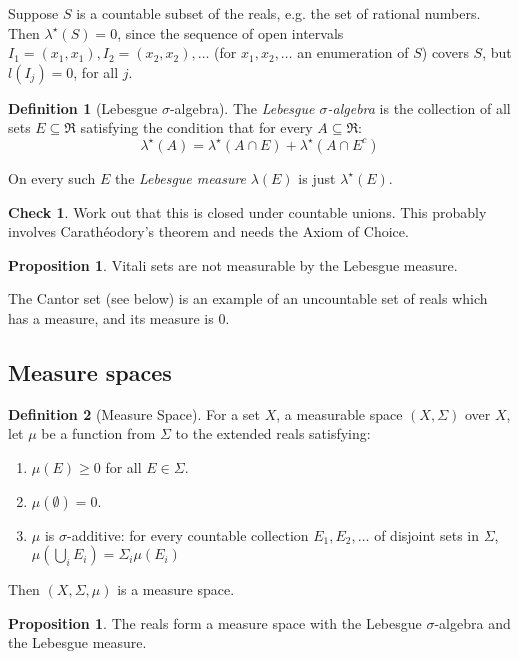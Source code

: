 \documentclass{article}
\theoremstyle{definition}
\newtheorem{definition}{Definition}[section]
\newtheorem{proposition}[theorem]{Proposition}
\newtheorem*{CHECK}{{\sc Check}}
\begin{document}
Suppose \(S\) is a countable subset of the reals, e.g.{} the set of rational numbers. Then \(\lambda^{\star}(S)=0\), since the sequence of open intervals \(I_1=(x_1,x_1), I_2=(x_2,x_2), \ldots\) (for \(x_1,x_2,\ldots\) an enumeration of \(S\)) covers \(S\), but \(l(I_j)=0\), for all \(j\).

\begin{definition}[Lebesgue \(\sigma\)-algebra]
  The {\em Lebesgue \(\sigma\)-algebra} is the collection of all sets \(E \subseteq \Re\) satisfying the condition that for every \(A\subseteq \Re\):
  \[ \lambda^{\star}(A) = \lambda^{\star}(A\cap E) + \lambda^{\star}(A \cap E^c)\]    

  On every such \(E\) the {\em Lebesgue measure} \(\lambda(E)\) is just \(\lambda^{\star}(E)\).
\end{definition}
\begin{CHECK}
  Work out that this is closed under countable unions. This probably involves Carath\'{e}odory's theorem and needs the Axiom of Choice.
\end{CHECK}  

\begin{proposition}
Vitali sets are not measurable by the Lebesgue measure.   
\end{proposition}


The Cantor set (see below) is an example of an uncountable set of reals which has a measure, and its measure is \(0\). 

\subsection{Measure spaces}
\begin{definition}[Measure Space] For a set \(X\), a measurable space \((X,\Sigma)\) over \(X\), let \(\mu\) be a function from \(\Sigma\) to the extended reals satisfying:
  \begin{enumerate}
  \item \(\mu(E) \geq 0\) for all \(E \in \Sigma\).
  \item \(\mu(\emptyset)=0\).
  \item \(\mu\) is \(\sigma\)-additive: for every countable collection \(E_1, E_2, \ldots\) of disjoint sets in \(\Sigma\), \(\mu(\bigcup_i E_i)=\Sigma_i \mu(E_i)\)
  \end{enumerate}
Then \((X,\Sigma,\mu)\) is a measure space.
\end{definition}

\begin{proposition}
  The reals form a measure space with the Lebesgue \(\sigma\)-algebra and the Lebesgue measure.   
\end{proposition}
\end{document}
